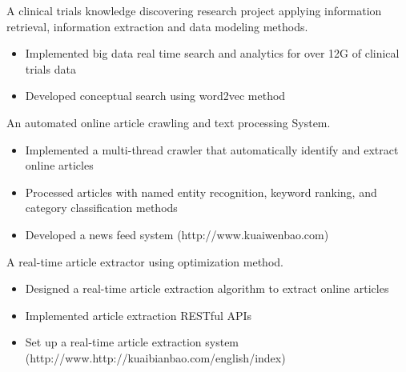 \documentclass{resume}
\begin{document}
A clinical trials knowledge discovering research project applying information retrieval, information extraction and data modeling methods.
\begin{itemize}
  \item Implemented big data real time search and analytics for over 12G of clinical trials data
  \item Developed conceptual search using word2vec method
\end{itemize}

An automated online article crawling and text processing System.
\begin{itemize}
  \item Implemented a multi-thread crawler that automatically identify and extract online articles
  \item Processed articles with named entity recognition, keyword ranking, and category classification methods
  \item Developed a news feed system (http://www.kuaiwenbao.com)
\end{itemize}


A real-time article extractor using optimization method.
\begin{itemize}
  \item Designed a real-time article extraction algorithm to extract online articles
  \item Implemented article extraction RESTful APIs
  \item Set up a real-time article extraction system (http://www.http://kuaibianbao.com/english/index)
\end{itemize}


\end{document}
